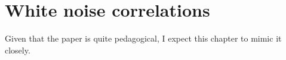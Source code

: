 \chapter{White noise correlations}
\label{ch:white_noise_correlations}

Given that the paper is quite pedagogical, I expect this chapter to mimic it closely.